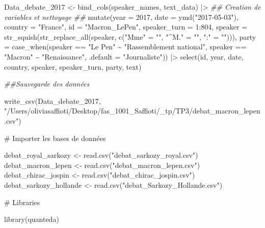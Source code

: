 \documentclass[
  letterpaper,
  DIV=11,
  numbers=noendperiod]{scrartcl}
\newenvironment{Shaded}{\begin{snugshade}}{\end{snugshade}}
\newcommand{\AttributeTok}[1]{\textcolor[rgb]{0.40,0.45,0.13}{#1}}
\newcommand{\CommentTok}[1]{\textcolor[rgb]{0.37,0.37,0.37}{#1}}
\newcommand{\DecValTok}[1]{\textcolor[rgb]{0.68,0.00,0.00}{#1}}
\newcommand{\DocumentationTok}[1]{\textcolor[rgb]{0.37,0.37,0.37}{\textit{#1}}}
\newcommand{\FunctionTok}[1]{\textcolor[rgb]{0.28,0.35,0.67}{#1}}
\newcommand{\NormalTok}[1]{\textcolor[rgb]{0.00,0.23,0.31}{#1}}
\newcommand{\OtherTok}[1]{\textcolor[rgb]{0.00,0.23,0.31}{#1}}
\newcommand{\SpecialCharTok}[1]{\textcolor[rgb]{0.37,0.37,0.37}{#1}}
\newcommand{\StringTok}[1]{\textcolor[rgb]{0.13,0.47,0.30}{#1}}
\begin{document}
\begin{Shaded}
\begin{Highlighting}[]
\NormalTok{Data\_debate\_2017 }\OtherTok{\textless{}{-}} \FunctionTok{bind\_cols}\NormalTok{(speaker\_names, text\_data) }\SpecialCharTok{|\textgreater{}} 
  \DocumentationTok{\#\# Creation de variables et nettoyage \#\#}
  \FunctionTok{mutate}\NormalTok{(}\AttributeTok{year         =} \DecValTok{2017}\NormalTok{, }
         \AttributeTok{date         =} \FunctionTok{ymd}\NormalTok{(}\StringTok{"2017{-}05{-}03"}\NormalTok{), }
         \AttributeTok{country      =} \StringTok{"France"}\NormalTok{, }
         \AttributeTok{id           =} \StringTok{"Macron\_LePen"}\NormalTok{,}
         \AttributeTok{speaker\_turn =} \DecValTok{1}\SpecialCharTok{:}\DecValTok{804}\NormalTok{,}
         \AttributeTok{speaker =} \FunctionTok{str\_squish}\NormalTok{(}\FunctionTok{str\_replace\_all}\NormalTok{(speaker, }\FunctionTok{c}\NormalTok{(}\StringTok{"Mme"} \OtherTok{=} \StringTok{""}\NormalTok{,}
                                                         \StringTok{"\^{}M."} \OtherTok{=} \StringTok{""}\NormalTok{,}
                                                         \StringTok{":"}   \OtherTok{=} \StringTok{""}\NormalTok{))),}
         \AttributeTok{party =} \FunctionTok{case\_when}\NormalTok{(speaker }\SpecialCharTok{==} \StringTok{"Le Pen"} \SpecialCharTok{\textasciitilde{}} \StringTok{"Rassemblement national"}\NormalTok{,}
\NormalTok{                           speaker }\SpecialCharTok{==} \StringTok{"Macron"} \SpecialCharTok{\textasciitilde{}} \StringTok{"Renaissance"}\NormalTok{,}
                           \AttributeTok{.default =} \StringTok{"Journaliste"}\NormalTok{)) }\SpecialCharTok{|\textgreater{}} 
  \FunctionTok{select}\NormalTok{(id, year, date, country, speaker, speaker\_turn, party, text)}

\DocumentationTok{\#\#Sauvegarde des données}

\FunctionTok{write\_csv}\NormalTok{(Data\_debate\_2017, }\StringTok{"/Users/oliviasaffioti/Desktop/fas\_1001\_Saffioti/\_tp/TP3/debat\_macron\_lepen.csv"}\NormalTok{)}
\end{Highlighting}
\end{Shaded}

\begin{Shaded}
\begin{Highlighting}[]
\CommentTok{\# Importer les bases de données}

\NormalTok{debat\_royal\_sarkozy }\OtherTok{\textless{}{-}} \FunctionTok{read.csv}\NormalTok{(}\StringTok{"debat\_sarkozy\_royal.csv"}\NormalTok{)}
\NormalTok{debat\_macron\_lepen }\OtherTok{\textless{}{-}} \FunctionTok{read.csv}\NormalTok{(}\StringTok{"debat\_macron\_lepen.csv"}\NormalTok{)}
\NormalTok{debat\_chirac\_jospin }\OtherTok{\textless{}{-}} \FunctionTok{read.csv}\NormalTok{(}\StringTok{"debat\_chirac\_jospin.csv"}\NormalTok{)}
\NormalTok{debat\_sarkozy\_hollande }\OtherTok{\textless{}{-}} \FunctionTok{read.csv}\NormalTok{(}\StringTok{"debat\_Sarkozy\_Hollande.csv"}\NormalTok{)}

\CommentTok{\# Libraries}

\FunctionTok{library}\NormalTok{(quanteda)}
\end{Highlighting}
\end{Shaded}
\end{document}
